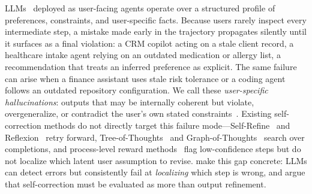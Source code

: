\documentclass{article}
\begin{document}
LLMs~\citep{ouyang2022instructgpt, openai2023gpt4} deployed as user-facing agents operate over a structured profile of preferences, constraints, and user-specific facts. Because users rarely inspect every intermediate step, a mistake made early in the trajectory propagates silently until it surfaces as a final violation: a CRM copilot acting on a stale client record, a healthcare intake agent relying on an outdated medication or allergy list, a recommendation that treats an inferred preference as explicit. The same failure can arise when a finance assistant uses stale risk tolerance or a coding agent follows an outdated repository configuration. We call these \emph{user-specific hallucinations}: outputs that may be internally coherent but violate, overgeneralize, or contradict the user's own stated constraints~\citep{sun2024pfqabench, xie2024travelplanner}. Existing self-correction methods do not directly target this failure mode---Self-Refine~\citep{madaan2023selfrefine} and Reflexion~\citep{shinn2023reflexion} retry forward, Tree-of-Thoughts~\citep{yao2023tot} and Graph-of-Thoughts~\citep{besta2024got} search over completions, and process-level reward methods~\citep{lightman2023verify} flag low-confidence steps but do not localize which latent user assumption to revise. \citet{tyen2024llmerrors} make this gap concrete: LLMs can detect errors but consistently fail at \emph{localizing} which step is wrong, and \citet{he2025selfcorrect} argue that self-correction must be evaluated as more than output refinement.
\end{document}
